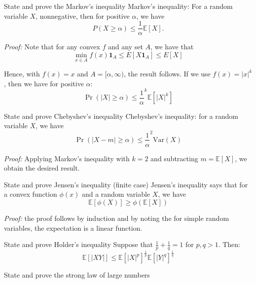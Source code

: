 \documentclass[avery5388,grid,frame]{flashcards}
\newcommand{\E}{\mathbb{E}}
\newcommand{\Var}{\text{Var}}
\begin{document}
\begin{flashcard}
    {State and prove the Markov's inequality}
    Markov's inequality: For a random variable $X$, nonnegative, then for positive $\alpha$, we have
    $$P(X \geq \alpha) \leq \frac 1 \alpha \E[X].$$

    \emph{Proof:} Note that for any convex $f$ and any set $A$, we have that
    $$\min_{x \in A} f(x) \mathbf 1_{A} \leq E[X \mathbf 1_{A}] \leq E[X]$$

    Hence, with $f(x) = x$ and $A = [\alpha,\infty)$, the result follows. If we use $f(x) = |x|^k$, then we have for positive $\alpha$:
    $$\Pr(|X| \geq \alpha) \leq \frac 1 \alpha^k \E[|X|^k]$$
\end{flashcard}


\begin{flashcard}
    {State and prove Chebyshev's inequality}
    Chebyshev's inequality: for a random variable $X$, we have
    $$\Pr(|X - m| \geq \alpha) \leq \frac 1 \alpha^2 \Var(X)$$

    \emph{Proof:} Applying Markov's inequality with $k=2$ and subtracting $m = \E[X]$, we obtain the desired result.
\end{flashcard}


\begin{flashcard}
    {State and prove Jensen's inequality (finite case)}
    Jensen's inequality says that for a convex function $\phi(x)$ and a random variable $X$, we have
    $$\E[\phi(X)] \geq \phi(\E[X])$$

    \emph{Proof:} the proof follows by induction and by noting the for simple random variables, the expectation is a linear function.
\end{flashcard}


\begin{flashcard}
    {State and prove Holder's inequality}
    Suppose that $\frac 1 p + \frac 1 q = 1$ for $p,q>1$. Then:
    $$\E[|XY|] \leq \E[|X|^p]^{\frac 1 p} \E[|Y|^q]^{\frac 1 q}$$
\end{flashcard}


\begin{flashcard}
    {State and prove the strong law of large numbers}
    
\end{flashcard}
\end{document}
